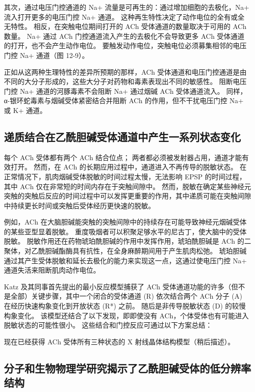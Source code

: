 其次，通过电压门控通道的 Na+ 流量是可再生的：通过增加细胞的去极化，Na+ 流入打开更多的电压门控 Na+ 通道。 
这种再生特性决定了动作电位的全有或全无特性。 
相反，在突触电位期间打开的 ACh 受体通道的数量取决于可用的 ACh 数量。 
Na+ 通过 ACh 门控通道流入产生的去极化不会导致更多 ACh 受体通道的打开，也不会产生动作电位。 
要触发动作电位，突触电位必须募集相邻的电压门控 Na+ 通道（图 12-9）。


正如从这两种生理特性的差异所预期的那样，ACh 受体通道和电压门控通道是由不同的大分子形成的，这些大分子对药物和毒素表现出不同的敏感性。 
阻断电压门控 Na+ 通道的河豚毒素不会阻断 Na+ 通过烟碱 ACh 受体通道流入。 
同样，α-银环蛇毒素与烟碱受体紧密结合并阻断 ACh 的作用，但不干扰电压门控 Na+ 或 K+ 通道。


\subsection{递质结合在乙酰胆碱受体通道中产生一系列状态变化}
每个 ACh 受体都有两个 ACh 结合位点； 两者都必须被发射器占用，通道才能有效打开。 
然而，在 ACh 的长期应用过程中，通道进入不再传导的脱敏状态。 
在正常情况下，肌肉烟碱受体脱敏的时间过程太慢，无法影响 EPSP 的时间过程，其中 ACh 仅在非常短的时间内存在于突触间隙中。 
然而，脱敏在确定某些神经元突触的突触后反应的时间过程中可以发挥更重要的作用，其中递质可能在突触间隙中持续更长时间或突触后受体经历更快速的脱敏。


例如，ACh 在大脑胆碱能突触的突触间隙中的持续存在可能导致神经元烟碱受体的某些亚型显着脱敏。 
重度吸烟者可以积聚足够水平的尼古丁，使大脑中的受体脱敏。 
脱敏作用还在药物琥珀酰胆碱的作用中发挥作用，琥珀酰胆碱是 ACh 的二聚体，对乙酰胆碱酯酶具有抗性，在全身麻醉期间用于产生肌肉松弛。 
琥珀胆碱通过其产生受体脱敏和延长去极化的能力来实现这一点，这通过使电压门控 Na+ 通道失活来阻断肌肉动作电位。


Katz 及其同事首先提出的最小反应模型捕获了 ACh 受体通道功能的许多（但不是全部）关键步骤，其中一个闭合的受体通道 (R) 依次结合两个 ACh 分子 (A) 在经历快速构象变化到开放状态 (R*) 之前。 
随后是非传导脱敏状态 (D) 的较慢构象变化。 
该模型还结合了以下发现，即即使没有 ACh，个体受体也有可能进入脱敏状态的可能性很小。 
这些结合和门控反应可通过以下方案总结：


现在已经获得 ACh 受体所有三种状态的 X 射线晶体结构模型（稍后描述）。


\subsection{分子和生物物理学研究揭示了乙酰胆碱受体的低分辨率结构}

